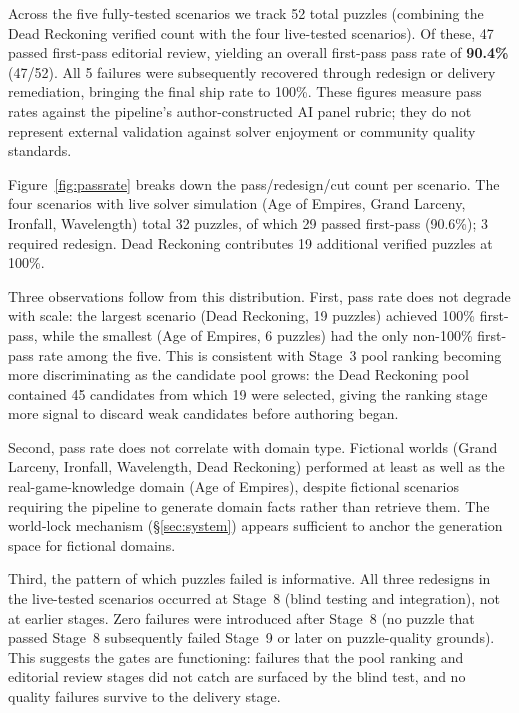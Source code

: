 Across the five fully-tested scenarios we track 52 total puzzles (combining the Dead Reckoning verified count with the four live-tested scenarios). Of these, 47 passed first-pass editorial review, yielding an overall first-pass pass rate of \textbf{90.4\%} (47/52). All 5 failures were subsequently recovered through redesign or delivery remediation, bringing the final ship rate to 100\%. These figures measure pass rates against the pipeline's author-constructed AI panel rubric; they do not represent external validation against solver enjoyment or community quality standards.

Figure~\ref{fig:passrate} breaks down the pass/redesign/cut count per scenario. The four scenarios with live solver simulation (Age of Empires, Grand Larceny, Ironfall, Wavelength) total 32 puzzles, of which 29 passed first-pass (90.6\%); 3 required redesign. Dead Reckoning contributes 19 additional verified puzzles at 100\%.

Three observations follow from this distribution. First, pass rate does not degrade with scale: the largest scenario (Dead Reckoning, 19 puzzles) achieved 100\% first-pass, while the smallest (Age of Empires, 6 puzzles) had the only non-100\% first-pass rate among the five. This is consistent with Stage~3 pool ranking becoming more discriminating as the candidate pool grows: the Dead Reckoning pool contained 45 candidates from which 19 were selected, giving the ranking stage more signal to discard weak candidates before authoring began.

Second, pass rate does not correlate with domain type. Fictional worlds (Grand Larceny, Ironfall, Wavelength, Dead Reckoning) performed at least as well as the real-game-knowledge domain (Age of Empires), despite fictional scenarios requiring the pipeline to generate domain facts rather than retrieve them. The world-lock mechanism (\S\ref{sec:system}) appears sufficient to anchor the generation space for fictional domains.

Third, the pattern of which puzzles failed is informative. All three redesigns in the live-tested scenarios occurred at Stage~8 (blind testing and integration), not at earlier stages. Zero failures were introduced after Stage~8 (no puzzle that passed Stage~8 subsequently failed Stage~9 or later on puzzle-quality grounds). This suggests the gates are functioning: failures that the pool ranking and editorial review stages did not catch are surfaced by the blind test, and no quality failures survive to the delivery stage.

